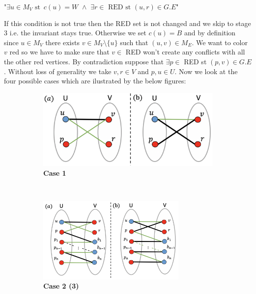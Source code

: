 \documentclass[10pt,a4paper]{article}
\begin{document}
\begin{center}
"$\exists u \in M_V \text{ st } \, c(u) = W\,\, \land \, \, \exists r \in \text{ RED  st  } (u,r)\in G.E$"
\end{center}
If this condition is not true then the RED set is not changed and we skip to stage 3 i.e. the invariant stays true.
Otherwise we set $c(u) = B$ and by definition since $u \in M_V$ there exists $v \in M_V \setminus \{u\}$ such that $(u,v) \in M_E$. We want to color $v$ red so we have to make sure that $v \in $ RED won't create any conflicts with all the other red vertices. By contradiction suppose that $\exists p \in $ RED st $(p,v) \in G.E$. Without loss of generality we take $v,r \in V$ and $p,u \in U$. Now we look at the four possible cases which are ilustrated by the below figures: 
\begin{figure}[h!]
\centering
    \begin{subfigure}[t]{0.5\textwidth}
        \centering
        \includegraphics[width = \textwidth]{case_1}
        \caption*{ \textbf{Case 1}}
    \end{subfigure}%
    ~ 
    \begin{subfigure}[t]{0.5\textwidth}
        \centering
        \includegraphics[width = 0.8\textwidth]{case_2}
        \caption*{\textbf{Case 2 (3)}}
    \end{subfigure}
    \begin{subfigure}[t]{0.5\textwidth}

\end{subfigure}
\end{figure}
\end{document}
